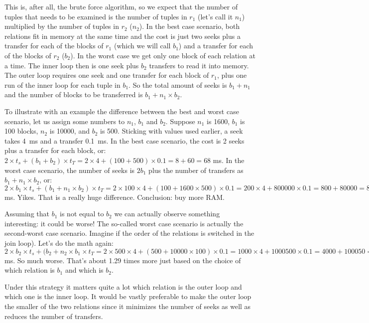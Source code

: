 This is, after all, the brute force algorithm, so we expect that the number of tuples that needs to be examined is the number of tuples in $r_{1}$ (let's call it $n_{1}$) multiplied by the number of tuples in $r_{2}$ ($n_{2}$). In the best case scenario, both relations fit in memory at the same time and the cost is just two seeks plus a transfer for each of the blocks of $r_{1}$ (which we will call $b_{1}$) and a transfer for each of the blocks of $r_{2}$ ($b_{2}$). In the worst case we get only one block of each relation at a time. The inner loop then is one seek plus $b_{2}$ transfers to read it into memory. The outer loop requires one seek and one transfer for each block of $r_{1}$, plus one run of the inner loop for each tuple in $b_{1}$. So the total amount of seeks is $b_{1} + n_{1}$ and the number of blocks to be transferred is $b_{1} + n_{1} \times b_{2}$.

To illustrate with an example the difference between the best and worst case scenario, let us assign some numbers to $n_{1}$, $b_{1}$ and $b_{2}$. Suppose $n_{1}$ is 1600, $b_{1}$ is 100 blocks, $n_{2}$ is 10000, and $b_{2}$ is 500. Sticking with values used earlier, a seek takes 4~ms and a transfer 0.1~ms. In the best case scenario, the cost is 2 seeks plus a transfer for each block, or: $2 \times t_{s} + (b_{1} + b_{2}) \times t_{T} = 2 \times 4 + (100 + 500) \times 0.1 = 8 + 60 = 68$ ms. In the worst case scenario, the number of seeks is $2b_{1}$ plus the number of transfers as $b_{1} + n_{1} \times b_{2}$, or: $2 \times b_{1} \times t_{s} + (b_{1} + n_{1} \times b_{2}) \times t_{T} = 2 \times 100 \times 4 + (100 + 1600 \times 500) \times 0.1 = 200 \times 4 + 800000 \times 0.1 = 800 + 80000 = 80800$ ms. Yikes. That is a really huge difference. Conclusion: buy more RAM.

Assuming that $b_{1}$ is not equal to $b_{2}$ we can actually observe something interesting: it could be worse! The so-called worst case scenario is actually the second-worst case scenario. Imagine if the order of the relations is switched in the join loop). Let's do the math again: $2 \times b_{2} \times t_{s} + (b_{2} + n_{2} \times b_{1} \times t_{T} = 2 \times 500 \times 4 + (500 + 10000 \times 100) \times 0.1 = 1000 \times 4 + 1000500 \times 0.1 = 4000 + 100050 = 104050$ ms. So much worse. That's about 1.29 times more just based on the choice of which relation is $b_{1}$ and which is $b_{2}$.

Under this strategy it matters quite a lot which relation is the outer loop and which one is the inner loop. It would be vastly preferable to make the outer loop the smaller of the two relations since it minimizes the number of seeks as well as reduces the number of transfers. 

